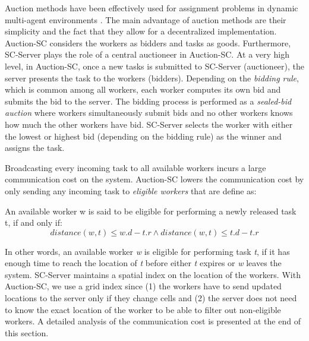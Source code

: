 
Auction methods have been effectively used for assignment problems in dynamic multi-agent environments \cite{Mehta05,Lagoudakis04}. The main advantage of auction methods are their simplicity and the fact that they allow for a decentralized implementation. Auction-SC considers the workers as bidders and tasks as goods. Furthermore, SC-Server plays the role of a central auctioneer in Auction-SC. At a very high level, in Auction-SC, once a new tasks is submitted to SC-Server (auctioneer), the server presents the task to the workers (bidders). Depending on the \textit{bidding rule}, which is common among all workers, each worker computes its own bid and submits the bid to the server. The bidding process is performed as a \textit{sealed-bid auction} where workers simultaneously submit bids and no other workers knows how much the other workers have bid. SC-Server selects the worker with either the lowest or highest bid (depending on the bidding rule) as the winner and assigns the task.

Broadcasting every incoming task to all available workers incurs a large communication cost on the system. Auction-SC lowers the communication cost by only sending any incoming task to \textit{eligible workers} that are define as:

\begin{definition} 
An available worker w is said to be eligible for performing a newly released task t, if and only if:
\begin{equation*}
distance(w, t) \leq w.d - t.r \wedge distance(w, t) \leq t.d - t.r
\end{equation*}
\end{definition}

\noindent In other words, an available worker \textit{w} is eligible for performing task \textit{t}, if it has enough time to reach the location of \textit{t} before either \textit{t} expires or \textit{w} leaves the system. SC-Server maintains a spatial index on the location of the workers. With Auction-SC, we use a grid index since (1) the workers have to send updated locations to the server only if they change cells and (2) the server does not need to know the exact location of the worker to be able to filter out non-eligible workers. A detailed analysis of the communication cost is presented at the end of this section.

